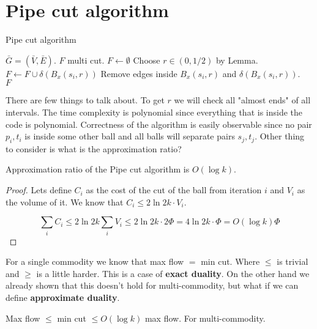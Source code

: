 \section{Pipe cut algorithm}

\begin{algorithm}[!h]
	\caption{Pipe cut algorithm}
	\begin{algorithmic}[1]
		\Require $\bar{G} = (\bar{V}, \bar{E})$.
		\Ensure $F$ multi cut.
		\State $F \gets \emptyset$
				\State Choose $r \in (0, 1/2)$ by Lemma.
				\State $F \gets F \cup \delta(B_{x}(s_{i}, r))$
				\State Remove edges inside $B_{x}(s_{i}, r)$ and $\delta(B_{x}(s_{i}, r))$.
			\EndIf
		\EndFor \\
		\Return $F$
	\end{algorithmic}
\end{algorithm}



There are few things to talk about. To get $r$ we will check all "almost ends" of all intervals. The time complexity is polynomial since everything that is inside the code is polynomial. Correctness of the algorithm is easily observable since no pair $p_{i},t_{i}$ is inside some other ball and all balls will separate pairs $s_{j}, t_{j}$. Other thing to consider is what is the approximation ratio?

\begin{thm}
	Approximation ratio of the Pipe cut algorithm is $O(\log k)$.
\end{thm}

\begin{proof}
	Lets define $C_{i}$ as the cost of the cut of the ball from iteration $i$ and $V_{i}$ as the volume of it. We know that $C_{i} \leq 2 \ln 2k \cdot V_{i}$.
	
	$$
	\sum_{i} C_{i} \leq 2 \ln 2k \sum_{i}V_{i} \leq 2 \ln 2k \cdot 2 \Phi = 4 \ln 2k \cdot \Phi = O (\log k) \Phi
	$$
\end{proof}

For a single commodity we know that max flow $=$ min cut. Where $\leq$ is trivial and $\geq$ is a little harder. This is a case of \textbf{exact duality}. On the other hand we already shown that this doesn't hold for multi-commodity, but what if we can define \textbf{approximate duality}.

\begin{cor}
	Max flow $\leq$ min cut $\leq O(\log k)$ max flow. For multi-commodity.
\end{cor}

